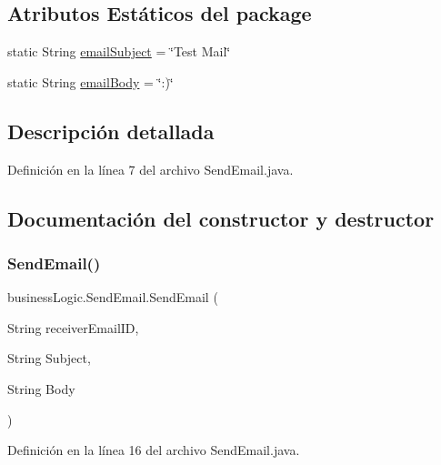 \subsection*{Atributos Estáticos del \textquotesingle{}package\textquotesingle{}}
\begin{DoxyCompactItemize}
\item 
static String \mbox{\hyperlink{classbusiness_logic_1_1_send_email_ae03ffb4b828745d6f4cec012064760fe}{email\+Subject}} = \char`\"{}Test Mail\char`\"{}
\item 
static String \mbox{\hyperlink{classbusiness_logic_1_1_send_email_abd4287e31ab6595894df6a666bc09bfd}{email\+Body}} = \char`\"{}\+:)\char`\"{}
\end{DoxyCompactItemize}


\subsection{Descripción detallada}


Definición en la línea 7 del archivo Send\+Email.\+java.



\subsection{Documentación del constructor y destructor}
\mbox{\label{classbusiness_logic_1_1_send_email_ad544aa16db4f9e424ad3db5e8af40bb4}} 
\subsubsection{\texorpdfstring{SendEmail()}{SendEmail()}}
{\footnotesize\ttfamily business\+Logic.\+Send\+Email.\+Send\+Email (\begin{DoxyParamCaption}\item[{String}]{receiver\+Email\+ID,  }\item[{String}]{Subject,  }\item[{String}]{Body }\end{DoxyParamCaption})}



Definición en la línea 16 del archivo Send\+Email.\+java.


